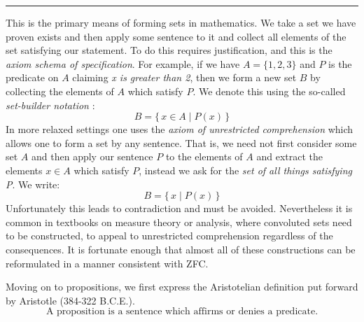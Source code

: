            \hrule\par\hfill\par
            This is the primary means of forming sets in mathematics. We take a set
            we have proven exists and then apply some sentence to it and collect all
            elements of the set satisfying our statement. To do this requires
            justification, and this is the \textit{axiom schema of specification}.
            For example, if we have $A=\{1,2,3\}$ and $P$ is the predicate on $A$
            claiming \textit{x is greater than 2}, then we form a new set $B$ by
            collecting the elements of $A$ which satisfy $P$. We denote this using
            the so-called \textit{set-builder notation}%
            :
            \begin{equation}
                B=\{\,x\in{A}\;|\;P(x)\,\}
            \end{equation}
            In more relaxed settings one uses the \textit{axiom of unrestricted}
            \textit{comprehension} which
            allows one to form a set by any sentence. That is, we need not first
            consider some set $A$ and then apply our sentence $P$ to the elements of
            $A$ and extract the elements $x\in{A}$ which satisfy $P$, instead we
            ask for the \textit{set of all things satisfying P}. We write:
            \begin{equation}
                B=\{\,x\;|\;P(x)\,\}
            \end{equation}
            Unfortunately this leads to contradiction and must be avoided.
            Nevertheless it is common in textbooks on measure theory or analysis,
            where convoluted sets need to be constructed, to appeal to unrestricted
            comprehension regardless of the consequences. It is fortunate enough
            that almost all of these constructions can be reformulated in a manner
            consistent with ZFC.
            \par\hfill\par
            Moving on to propositions, we first express the Aristotelian
            definition put forward by Aristotle (384-322 B.C.E.).
            \begin{equation}
                \text{A proposition is a sentence which affirms or denies a }
                \text{predicate.}
            \end{equation}
